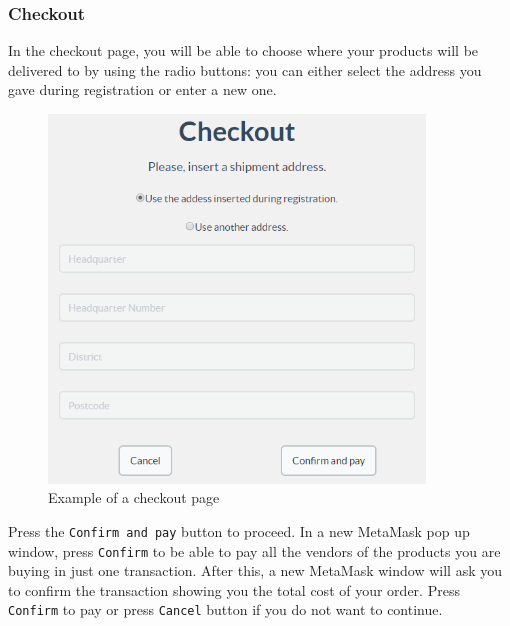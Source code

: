 	\subsubsection{Checkout}
	In the checkout page, you will be able to choose where your products will be 
	delivered to by using the radio buttons: you can either select the address 
	you gave during registration or enter a new one.\\
	\begin{figure}[H]
		\includegraphics[width=10cm]{res/images/checkout.png}
		\centering
		\caption{Example of a checkout page}
	\end{figure}
	\noindent Press the \texttt{Confirm and pay} button to proceed. In a new 
	MetaMask\glo{} pop up window, press \texttt{Confirm} to be able to pay all the 
	vendors of the products you are buying in just one transaction. After this, 
	a new MetaMask\glo{} window will ask you to confirm the transaction showing you 
	the total cost of your order. Press \texttt{Confirm} to pay or press \texttt{Cancel} 
	button if you do not want to continue.

